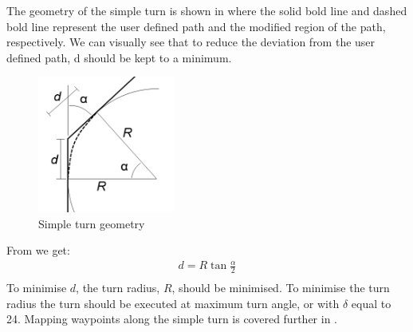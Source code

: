 \documentclass[main.tex]{subfiles}
\begin{document}
The geometry of the simple turn is shown in  where the solid bold line and dashed bold line represent the user defined path and the modified region of the path, respectively. We can visually see that to reduce the deviation from the user defined path, d should be kept to a minimum.
\begin{figure}[ht]
\includegraphics[width=0.4\textwidth]{4-DetailedDesign/simpleTurnGeometry.png}
\centering
\caption{Simple turn geometry} 
\end{figure} 
From  we get:
\begin{align}
d = R \tan{\frac{\alpha}{2}}\\
\end{align}
To minimise $d$, the turn radius, $R$, should be minimised. To minimise the turn radius the turn should be executed at maximum turn angle, or with $\delta$ equal to 24\degree. Mapping waypoints along the simple turn is covered further in .
\end{document}
